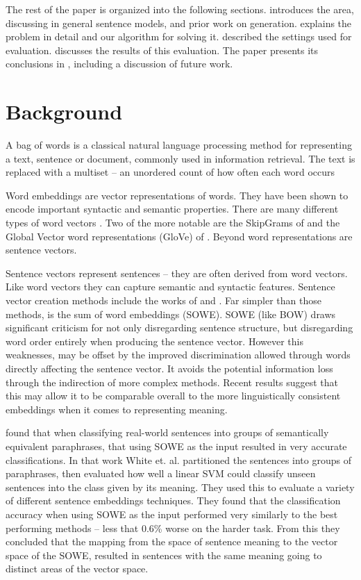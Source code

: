 \documentclass{llncs}
\begin{document}
The rest of the paper is organized into the following sections.  introduces the area, discussing in general sentence models, and prior work on generation.  explains the problem in detail and our algorithm for solving it.  described the settings used for evaluation.  discusses the results of this evaluation. The paper presents its conclusions in , including a discussion of future work.


\section{Background}\label{relwork}
A bag of words is a classical natural language processing method for representing a text, sentence or document, commonly used in information retrieval. The text is replaced with a multiset -- an unordered count of how often each word occurs 

Word embeddings are vector representations of words. They have been shown to encode important syntactic and semantic properties. There are many different types of word vectors \parencite{Yin2015}. Two of the more notable are the SkipGrams of \textcite{mikolov2013efficient,mikolov2013linguisticsubstructures} and the Global Vector word representations (GloVe) of \textcite{pennington2014glove}. Beyond word representations are sentence vectors. 

Sentence vectors represent sentences -- they are often derived from word vectors. Like word vectors they can capture semantic and syntactic features. Sentence vector creation methods include the works of \textcite{le2014distributed} and \textcite{socher2014recursive}. Far simpler than those methods, is the  sum of word embeddings (SOWE). SOWE (like BOW) draws significant criticism for not only disregarding sentence structure, but disregarding word order entirely when producing the sentence vector. However this weaknesses, may be offset by the improved discrimination allowed through words directly affecting the sentence vector. It avoids the potential information loss through the indirection of more complex methods. Recent results suggest that this may allow it to be comparable overall to the more linguistically consistent embeddings when it comes to representing meaning. 


\textcite{White2015SentVecMeaning} found that when classifying real-world sentences into groups of semantically equivalent paraphrases, that using SOWE as the input resulted in very accurate classifications. In that work White et. al. partitioned the sentences into groups of paraphrases, then evaluated how well a linear SVM could classify unseen sentences into the class given by its meaning. They used this to evaluate a  variety of different sentence embeddings techniques. They found that the classification accuracy when using SOWE as the input performed very similarly to the best performing methods -- less that 0.6\% worse on the harder task. From this they concluded that the mapping from the space of sentence meaning to the vector space of the SOWE, resulted in sentences with the same meaning going to distinct areas of the vector space.
\end{document}
